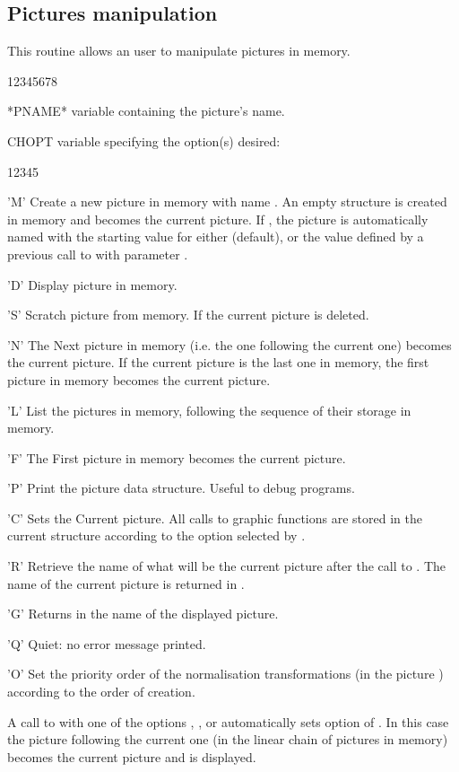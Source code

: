 \subsection{Pictures manipulation}
\Action
This routine allows an \HIGZ{} user to manipulate \HIGZ{} pictures in memory.
\Pdesc
\begin{DLtt}{12345678}
\item[*PNAME*]  variable containing the picture's name.
\item[CHOPT]  variable specifying the option(s) desired:
\begin{DLtt}{12345}
\item['M'] Create a new picture in memory with name .
           An empty structure is created in memory and becomes
           the current picture. If , the picture is
           automatically named  with the starting
           value for  either  (default), or the value
           defined by a previous call to  with parameter
           .
\item['D'] Display picture  in memory.
\item['S'] Scratch picture  from memory.
           If  the current picture is deleted.
\item['N'] The Next picture in memory (i.e. the one
           following the current one) becomes the current picture.
           If the current picture is the last one in memory,
           the first picture in memory becomes the current picture.
\item['L'] List the pictures in memory,
           following the sequence of their storage in memory.
\item['F'] The First picture in memory becomes the current picture.
\item['P'] Print the picture data structure. Useful to debug programs.
\item['C'] Sets the Current picture. All calls to \HIGZ{} graphic functions are
           stored in the current structure according to the option selected
           by .
\item['R'] Retrieve the name of what will be the current picture after the call
           to . The name of the current picture is returned in
           .
\item['G'] Returns in  the name of the displayed picture.
\item['Q'] Quiet: no error message printed.
\item['O'] Set the priority order of the normalisation transformations
           (in the picture ) according to the order of 
           creation.
\end{DLtt}
\end{DLtt}
\par
A call to  with one of the options , , 
or  automatically sets option  of . In this case
the picture following the current one (in the linear chain of pictures in
memory) becomes the current picture and is displayed.

